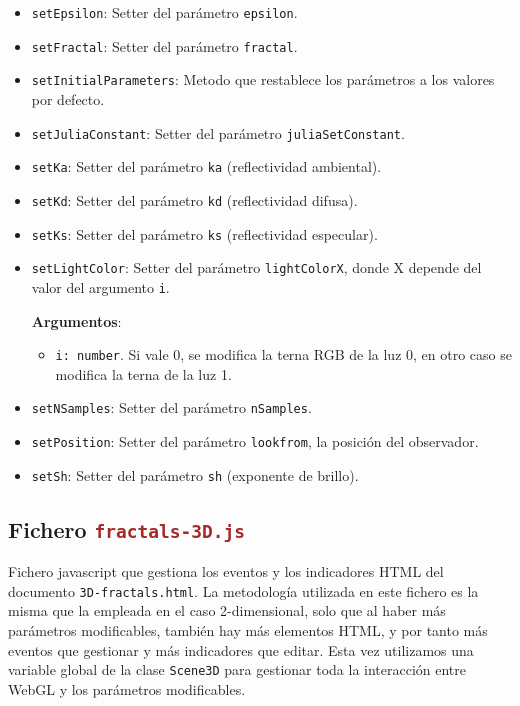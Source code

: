 \begin{itemize}
    \item \verb|setEpsilon|: Setter del parámetro \verb|epsilon|.
    \item \verb|setFractal|: Setter del parámetro \verb|fractal|.
    \item \verb|setInitialParameters|: Metodo que restablece los parámetros a los valores por defecto.
    \item \verb|setJuliaConstant|: Setter del parámetro \verb|juliaSetConstant|.
    \item \verb|setKa|: Setter del parámetro \verb|ka| (reflectividad ambiental).
    \item \verb|setKd|: Setter del parámetro \verb|kd| (reflectividad difusa).
    \item \verb|setKs|: Setter del parámetro \verb|ks| (reflectividad especular).
    \item \verb|setLightColor|: Setter del parámetro \verb|lightColorX|, donde X depende del valor del argumento \verb|i|.
    
    \textbf{Argumentos}:
    \begin{itemize}
        \item \verb|i: number|. Si vale 0, se modifica la terna RGB de la luz 0, en otro caso se modifica la terna de la luz 1.
    \end{itemize}
    \item \verb|setNSamples|: Setter del parámetro \verb|nSamples|.
    \item \verb|setPosition|: Setter del parámetro \verb|lookfrom|, la posición del observador.
    \item \verb|setSh|: Setter del parámetro \verb|sh| (exponente de brillo).
\end{itemize}

\subsection{Fichero \Large\texttt{\textcolor{brown}{fractals-3D.js}}}

Fichero javascript que gestiona los eventos y los indicadores HTML del documento \verb|3D-fractals.html|. La metodología utilizada en este fichero es la misma que la empleada en el caso 2-dimensional, solo que al haber más parámetros modificables, también hay más elementos HTML, y por tanto más eventos que gestionar y más indicadores que editar. Esta vez utilizamos una variable global de la clase \verb|Scene3D| para gestionar toda la interacción entre WebGL y los parámetros modificables.

